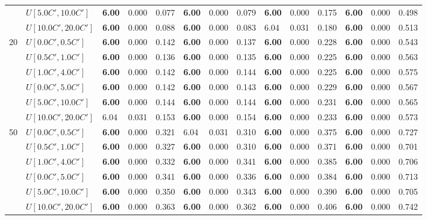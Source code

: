 \begin{table}[h]
{\begin{tabular}{|l|l||l|l|l||l|l|l||l|l|l||l|l|l|}
       & $U[5.0C',10.0C']$ & \textbf{6.00} & 0.000 & 0.077 & \textbf{6.00} & 0.000 & 0.079 & \textbf{6.00} & 0.000 & 0.175 & \textbf{6.00} & 0.000 & 0.498 \\
       & $U[10.0C',20.0C']$ & \textbf{6.00} & 0.000 & 0.088 & \textbf{6.00} & 0.000 & 0.083 & 6.04 & 0.031 & 0.180 & \textbf{6.00} & 0.000 & 0.513 \\
      \hline\hline
      \multirow{6}{*}{20} & $U[0.0C',0.5C']$ & \textbf{6.00} & 0.000 & 0.142 & \textbf{6.00} & 0.000 & 0.137 & \textbf{6.00} & 0.000 & 0.228 & \textbf{6.00} & 0.000 & 0.543 \\
       & $U[0.5C',1.0C']$ & \textbf{6.00} & 0.000 & 0.136 & \textbf{6.00} & 0.000 & 0.135 & \textbf{6.00} & 0.000 & 0.225 & \textbf{6.00} & 0.000 & 0.563 \\
       & $U[1.0C',4.0C']$ & \textbf{6.00} & 0.000 & 0.142 & \textbf{6.00} & 0.000 & 0.144 & \textbf{6.00} & 0.000 & 0.225 & \textbf{6.00} & 0.000 & 0.575 \\
       & $U[0.0C',5.0C']$ & \textbf{6.00} & 0.000 & 0.142 & \textbf{6.00} & 0.000 & 0.143 & \textbf{6.00} & 0.000 & 0.229 & \textbf{6.00} & 0.000 & 0.567 \\
       & $U[5.0C',10.0C']$ & \textbf{6.00} & 0.000 & 0.144 & \textbf{6.00} & 0.000 & 0.144 & \textbf{6.00} & 0.000 & 0.231 & \textbf{6.00} & 0.000 & 0.565 \\
       & $U[10.0C',20.0C']$ & 6.04 & 0.031 & 0.153 & \textbf{6.00} & 0.000 & 0.154 & \textbf{6.00} & 0.000 & 0.233 & \textbf{6.00} & 0.000 & 0.573 \\
      \hline\hline
      \multirow{6}{*}{50} & $U[0.0C',0.5C']$ & \textbf{6.00} & 0.000 & 0.321 & 6.04 & 0.031 & 0.310 & \textbf{6.00} & 0.000 & 0.375 & \textbf{6.00} & 0.000 & 0.727 \\
       & $U[0.5C',1.0C']$ & \textbf{6.00} & 0.000 & 0.327 & \textbf{6.00} & 0.000 & 0.310 & \textbf{6.00} & 0.000 & 0.371 & \textbf{6.00} & 0.000 & 0.701 \\
       & $U[1.0C',4.0C']$ & \textbf{6.00} & 0.000 & 0.332 & \textbf{6.00} & 0.000 & 0.341 & \textbf{6.00} & 0.000 & 0.385 & \textbf{6.00} & 0.000 & 0.706 \\
       & $U[0.0C',5.0C']$ & \textbf{6.00} & 0.000 & 0.341 & \textbf{6.00} & 0.000 & 0.336 & \textbf{6.00} & 0.000 & 0.384 & \textbf{6.00} & 0.000 & 0.713 \\
       & $U[5.0C',10.0C']$ & \textbf{6.00} & 0.000 & 0.350 & \textbf{6.00} & 0.000 & 0.343 & \textbf{6.00} & 0.000 & 0.390 & \textbf{6.00} & 0.000 & 0.705 \\
       & $U[10.0C',20.0C']$ & \textbf{6.00} & 0.000 & 0.363 & \textbf{6.00} & 0.000 & 0.362 & \textbf{6.00} & 0.000 & 0.406 & \textbf{6.00} & 0.000 & 0.742 \\
      \hline
      \end{tabular}
      }
      \label{tab:pcpn90p4}\end{table}
      
